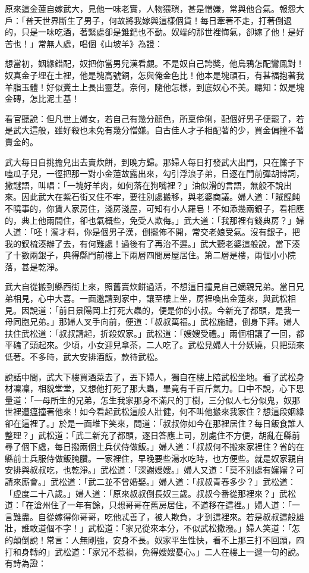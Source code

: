 原來這金蓮自嫁武大，見他一味老實，人物猥瑣，甚是憎嫌，常與他合氣。報怨大戶：「普天世界斷生了男子，何故將我嫁與這樣個貨！每日牽著不走，打著倒退的，只是一味吃酒，著緊處卻是錐鈀也不動。奴端的那世裡悔氣，卻嫁了他！是好苦也！」常無人處，唱個《山坡羊》為證：

想當初，姻緣錯配，奴把你當男兒漢看覷。不是奴自己誇獎，他烏鴉怎配鸞鳳對！奴真金子埋在土裡，他是塊高號銅，怎與俺金色比！他本是塊頑石，有甚福抱著我羊脂玉體！好似糞土上長出靈芝。奈何，隨他怎樣，到底奴心不美。聽知：奴是塊金磚，怎比泥土基！

看官聽說：但凡世上婦女，若自己有幾分顏色，所稟伶俐，配個好男子便罷了，若是武大這般，雖好殺也未免有幾分憎嫌。自古佳人才子相配著的少，買金偏撞不著賣金的。

武大每日自挑擔兒出去賣炊餅，到晚方歸。那婦人每日打發武大出門，只在簾子下嗑瓜子兒，一徑把那一對小金蓮故露出來，勾引浮浪子弟，日逐在門前彈胡博詞，撒謎語，叫唱：「一塊好羊肉，如何落在狗嘴裡？」油似滑的言語，無般不說出來。因此武大在紫石街又住不牢，要往別處搬移，與老婆商議。婦人道：「賊餛飩不曉事的，你賃人家房住，淺房淺屋，可知有小人羅皂！不如添幾兩銀子，看相應的，典上他兩間住，卻也氣概些，免受人欺侮。」武大道：「我那裡有錢典房？」婦人道：「呸！濁才料，你是個男子漢，倒擺佈不開，常交老娘受氣。沒有銀子，把我的釵梳湊辦了去，有何難處！過後有了再治不遲。」武大聽老婆這般說，當下湊了十數兩銀子，典得縣門前樓上下兩層四間房屋居住。第二層是樓，兩個小小院落，甚是乾淨。

武大自從搬到縣西街上來，照舊賣炊餅過活，不想這日撞見自己嫡親兄弟。當日兄弟相見，心中大喜。一面邀請到家中，讓至樓上坐，房裡喚出金蓮來，與武松相見。因說道：「前日景陽岡上打死大蟲的，便是你的小叔。今新充了都頭，是我一母同胞兄弟。」那婦人叉手向前，便道：「叔叔萬福。」武松施禮，倒身下拜。婦人扶住武松道：「叔叔請起，折殺奴家。」武松道：「嫂嫂受禮。」兩個相讓了一回，都平磕了頭起來。少頃，小女迎兒拿茶，二人吃了。武松見婦人十分妖嬈，只把頭來低著。不多時，武大安排酒飯，款待武松。

說話中間，武大下樓買酒菜去了，丟下婦人，獨自在樓上陪武松坐地。看了武松身材凜凜，相貌堂堂，又想他打死了那大蟲，畢竟有千百斤氣力。口中不說，心下思量道：「一母所生的兄弟，怎生我家那身不滿尺的丁樹，三分似人七分似鬼，奴那世裡遭瘟撞著他來！如今看起武松這般人壯健，何不叫他搬來我家住？想這段姻緣卻在這裡了。」於是一面堆下笑來，問道：「叔叔你如今在那裡居住？每日飯食誰人整理？」武松道：「武二新充了都頭，逐日答應上司，別處住不方便，胡亂在縣前尋了個下處，每日撥兩個土兵伏侍做飯。」婦人道：「叔叔何不搬來家裡住？省的在縣前土兵服侍做飯腌臢。一家裡住，早晚要些湯水吃時，也方便些。就是奴家親自安排與叔叔吃，也乾淨。」武松道：「深謝嫂嫂。」婦人又道：「莫不別處有嬸嬸？可請來廝會。」武松道：「武二並不曾婚娶。」婦人道：「叔叔青春多少？」武松道：「虛度二十八歲。」婦人道：「原來叔叔倒長奴三歲。叔叔今番從那裡來？」武松道：「在滄州住了一年有餘，只想哥哥在舊房居住，不道移在這裡。」婦人道：「一言難盡。自從嫁得你哥哥，吃他忒善了，被人欺負，才到這裡來。若是叔叔這般雄壯，誰敢道個不字！」武松道：「家兄從來本分，不似武松撒潑。」婦人笑道：「怎的顛倒說！常言：人無剛強，安身不長。奴家平生性快，看不上那三打不回頭，四打和身轉的」武松道：「家兄不惹禍，免得嫂嫂憂心。」二人在樓上一遞一句的說。有詩為證：

